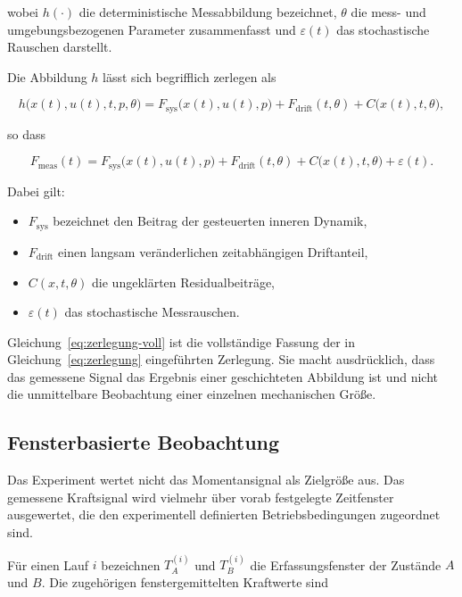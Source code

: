 \documentclass[12pt,a4paper]{report}
\begin{document}
wobei $h(\cdot)$ die deterministische Messabbildung bezeichnet, $\theta$
die mess- und umgebungsbezogenen Parameter zusammenfasst und
$\varepsilon(t)$ das stochastische Rauschen darstellt.

Die Abbildung $h$ lässt sich begrifflich zerlegen als

\begin{equation}
h\bigl(x(t),u(t),t,p,\theta\bigr)
=
F_{\mathrm{sys}}\bigl(x(t),u(t),p\bigr)
+
F_{\mathrm{drift}}(t,\theta)
+
C\bigl(x(t),t,\theta\bigr),
\label{eq:h-zerlegung}
\end{equation}

so dass

\begin{equation}
F_{\mathrm{meas}}(t)
=
F_{\mathrm{sys}}\bigl(x(t),u(t),p\bigr)
+
F_{\mathrm{drift}}(t,\theta)
+
C\bigl(x(t),t,\theta\bigr)
+
\varepsilon(t).
\label{eq:zerlegung-voll}
\end{equation}

Dabei gilt:

\begin{itemize}
\item $F_{\mathrm{sys}}$ bezeichnet den Beitrag der gesteuerten inneren
      Dynamik,
\item $F_{\mathrm{drift}}$ einen langsam veränderlichen zeitabhängigen
      Driftanteil,
\item $C(x,t,\theta)$ die ungeklärten Residualbeiträge,
\item $\varepsilon(t)$ das stochastische Messrauschen.
\end{itemize}

Gleichung~\eqref{eq:zerlegung-voll} ist die vollständige Fassung der in
Gleichung~\eqref{eq:zerlegung} eingeführten Zerlegung. Sie macht
ausdrücklich, dass das gemessene Signal das Ergebnis einer geschichteten
Abbildung ist und nicht die unmittelbare Beobachtung einer einzelnen
mechanischen Größe.

\subsection{Fensterbasierte Beobachtung}

Das Experiment wertet nicht das Momentansignal als Zielgröße aus. Das
gemessene Kraftsignal wird vielmehr über vorab festgelegte Zeitfenster
ausgewertet, die den experimentell definierten Betriebsbedingungen
zugeordnet sind.

Für einen Lauf $i$ bezeichnen $T_A^{(i)}$ und $T_B^{(i)}$ die
Erfassungsfenster der Zustände $A$ und $B$. Die zugehörigen
fenstergemittelten Kraftwerte sind
\end{document}
